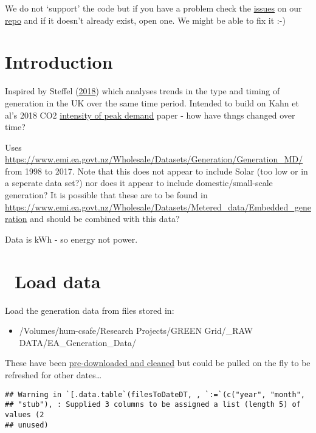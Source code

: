 \documentclass[]{article}
\providecommand{\tightlist}{%
  \setlength{\itemsep}{0pt}\setlength{\parskip}{0pt}}
\theoremstyle{definition}
\theoremstyle{definition}
\theoremstyle{definition}
\theoremstyle{remark}
\begin{document}
We do not `support' the code but if you have a problem check the
\href{https://git.soton.ac.uk/ba1e12/nzGREENGrid/issues}{issues} on our
\href{https://git.soton.ac.uk/ba1e12/nzGREENGrid}{repo} and if it
doesn't already exist, open one. We might be able to fix it :-)

\section{Introduction}\label{introduction}

Inspired by Steffel
(\href{https://www.sciencedirect.com/science/article/pii/S0301421516307017}{2018})
which analyses trends in the type and timing of generation in the UK
over the same time period. Intended to build on Kahn et al's 2018 CO2
\href{https://www.sciencedirect.com/science/article/pii/S0959652618306474?via\%3Dihub}{intensity
of peak demand} paper - how have thngs changed over time?

Uses
\url{https://www.emi.ea.govt.nz/Wholesale/Datasets/Generation/Generation_MD/}
from 1998 to 2017. Note that this does not appear to include Solar (too
low or in a seperate data set?) nor does it appear to include
domestic/small-scale generation? It is possible that these are to be
found in
\url{https://www.emi.ea.govt.nz/Wholesale/Datasets/Metered_data/Embedded_generation}
and should be combined with this data?

Data is kWh - so energy not power.

\section{~Load data}\label{load-data}

Load the generation data from files stored in:

\begin{itemize}
\tightlist
\item
  /Volumes/hum-csafe/Research Projects/GREEN Grid/\_RAW
  DATA/EA\_Generation\_Data/
\end{itemize}

These have been
\href{https://git.soton.ac.uk/ba1e12/nzGREENGrid/tree/master/dataProcessing/ea}{pre-downloaded
and cleaned} but could be pulled on the fly to be refreshed for other
dates\ldots{}

\begin{verbatim}
## Warning in `[.data.table`(filesToDateDT, , `:=`(c("year", "month",
## "stub"), : Supplied 3 columns to be assigned a list (length 5) of values (2
## unused)
\end{verbatim}
\end{document}
